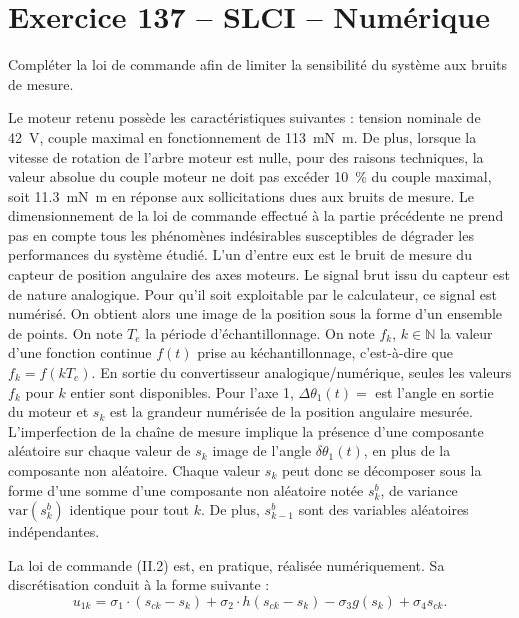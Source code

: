 \section*{Exercice 137 -- SLCI -- Numérique}
\setcounter{exo}{0}


\begin{obj}
Compléter la loi de commande afin de limiter la sensibilité du système aux bruits de mesure.
\end{obj}

Le moteur retenu possède les caractéristiques suivantes : tension nominale de \SI{42}{V}, couple maximal en fonctionnement
de \SI{113}{mN.m}. De plus, lorsque la vitesse de rotation de l’arbre moteur est nulle, pour des raisons
techniques, la valeur absolue du couple moteur ne doit pas excéder \SI{10}{\%} du couple maximal, soit \SI{11,3}{mN.m} en réponse aux sollicitations dues aux bruits de mesure.
Le dimensionnement de la loi de commande effectué à la partie précédente ne prend pas en compte tous les
phénomènes indésirables susceptibles de dégrader les performances du système étudié. L’un d’entre eux est le
bruit de mesure du capteur de position angulaire des axes moteurs. Le signal brut issu du capteur est de nature
analogique. Pour qu’il soit exploitable par le calculateur, ce signal est numérisé. On obtient alors une image de
la position sous la forme d’un ensemble de points. On note $T_e$ la période d’échantillonnage.
On note $f_k$, $k\in\mathbb{N}$ la valeur d’une fonction continue $f(t)$ prise au k\ieme échantillonnage, c’est-à-dire que
$f_k=f\left(kT_e\right)$. En sortie du convertisseur analogique/numérique, seules les valeurs $f_k$ pour $k$ entier sont disponibles.
Pour l’axe 1, $\Delta \theta_1(t)=$ est l’angle en sortie du moteur et $s_k$ est la grandeur numérisée de la position angulaire
mesurée.
L’imperfection de la chaîne de mesure implique la présence d’une composante aléatoire sur chaque valeur de $s_k$
image de l’angle $\delta \theta_1(t)$, en plus de la composante non aléatoire. Chaque valeur $s_k$ peut donc se décomposer
sous la forme d’une somme d’une composante non aléatoire notée $s_k^b$, de variance
$\text{var}\left( s_k^b\right)$ identique pour tout $k$. De plus, $s_{k-1}^b$ sont des variables aléatoires indépendantes.


La loi de commande (II.2) est, en pratique, réalisée numériquement. Sa discrétisation conduit à la forme suivante :
$$
u_{1k} = \sigma_1 \cdot\left(s_{ck}-s_k \right)+\sigma_2 \cdot h\left(s_{ck}-s_k \right)  -\sigma_3 g \left(s_k \right) + \sigma_4 s_{ck}.
$$

